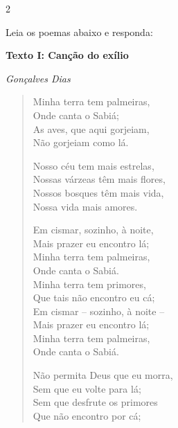 {{\begin{escolha}
\num{2}

Leia os poemas abaixo e responda:

\textbf{Texto I: Canção do exílio}

\emph{Gonçalves Dias}

\begin{verse}

Minha terra tem palmeiras, \\

Onde canta o Sabiá; \\

As aves, que aqui gorjeiam, \\

Não gorjeiam como lá. 


Nosso céu tem mais estrelas,\\

Nossas várzeas têm mais flores, \\

Nossos bosques têm mais vida, \\

Nossa vida mais amores.


Em cismar, sozinho, à noite, \\

Mais prazer eu encontro lá; \\

Minha terra tem palmeiras, \\

Onde canta o Sabiá. \\


Minha terra tem primores, \\

Que tais não encontro eu cá; \\

Em cismar -- sozinho, à noite -- \\

Mais prazer eu encontro lá; \\

Minha terra tem palmeiras, \\

Onde canta o Sabiá. 


Não permita Deus que eu morra, \\

Sem que eu volte para lá; \\

Sem que desfrute os primores \\

Que não encontro por cá; \\


\end{verse}
\end{escolha}}}
